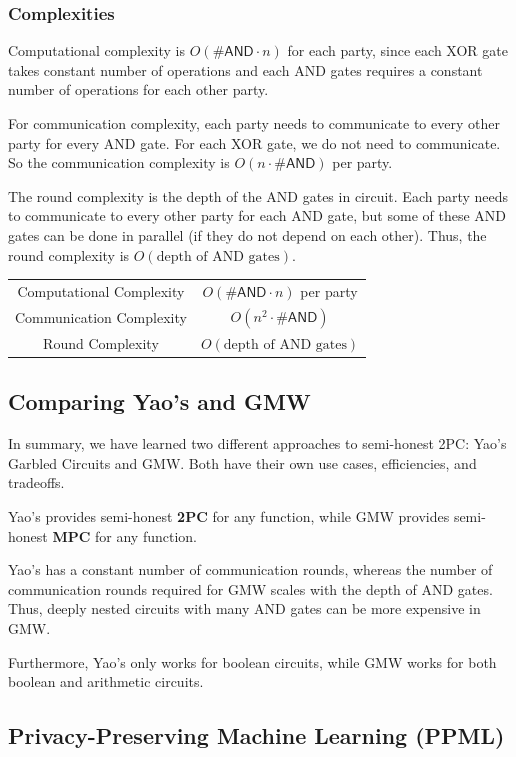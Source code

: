 \subsubsection{Complexities}
Computational complexity is $O(\#\mathsf{AND}\cdot n)$ for each party, since each XOR gate takes constant number of operations and each AND gates requires a constant number of operations for each other party.

For communication complexity, each party needs to communicate to every other party for every \textsf{AND} gate. For each XOR gate, we do not need to communicate. So the communication complexity is $O(n \cdot \#\mathsf{AND})$ per party.

The round complexity is the depth of the AND gates in circuit. Each party needs to communicate to every other party for each AND gate, but some of these AND gates can be done in parallel (if they do not depend on each other). Thus, the round complexity is $O(\text{depth of AND gates})$.

\begin{center}
\begin{tabular}{c|c} 
Computational Complexity & $O(\#\mathsf{AND}\cdot n)$ per party\\
Communication Complexity & $O(n^2\cdot \#\mathsf{AND})$\\
Round Complexity & $O(\text{depth of AND gates})$
\end{tabular}
\end{center}

\subsection{Comparing Yao's and GMW}
In summary, we have learned two different approaches to semi-honest 2PC: Yao's Garbled Circuits and GMW. Both have their own use cases, efficiencies, and tradeoffs.

Yao's provides semi-honest \textbf{2PC} for any function, while GMW provides semi-honest \textbf{MPC} for any function.

Yao's has a constant number of communication rounds, whereas the number of communication rounds required for GMW scales with the depth of AND gates. Thus, deeply nested circuits with many AND gates can be more expensive in GMW.

Furthermore, Yao's only works for boolean circuits, while GMW works for both boolean and arithmetic circuits.

\subsection{Privacy-Preserving Machine Learning (PPML)}

